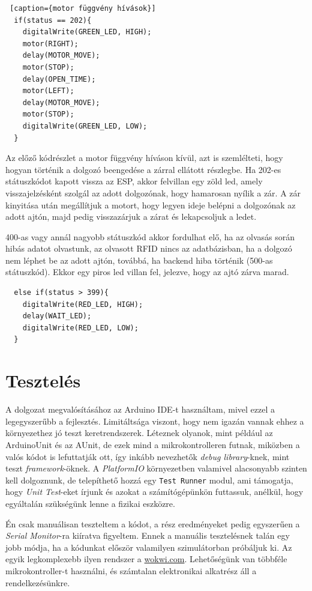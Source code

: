\documentclass[
]{thesis-ekf}
\theoremstyle{definition}
\theoremstyle{remark}
\begin{document}
\begin{lstlisting} [caption={motor függvény hívások}]
  if(status == 202){
    digitalWrite(GREEN_LED, HIGH);
    motor(RIGHT);
    delay(MOTOR_MOVE);
    motor(STOP);
    delay(OPEN_TIME);
    motor(LEFT);
    delay(MOTOR_MOVE);
    motor(STOP);
    digitalWrite(GREEN_LED, LOW);
  }
\end{lstlisting}

Az előző kódrészlet a motor függvény híváson kívül, azt is szemlélteti, hogy hogyan történik a dolgozó beengedése a zárral ellátott részlegbe. Ha 202-es státuszkódot kapott vissza az ESP, akkor felvillan egy zöld led, amely visszajelzésként szolgál az adott dolgozónak, hogy hamarosan nyílik a zár. A zár kinyitása után megállítjuk a motort, hogy legyen ideje belépni a dolgozónak az adott ajtón, majd pedig visszazárjuk a zárat és lekapcsoljuk a ledet.

400-as vagy annál nagyobb státuszkód akkor fordulhat elő, ha az olvasás során hibás adatot olvastunk, az olvasott RFID nincs az adatbázisban, ha a dolgozó nem léphet be az adott ajtón, továbbá, ha backend hiba történik (500-as státuszkód). Ekkor egy piros led villan fel, jelezve, hogy az ajtó zárva marad.

\begin{lstlisting}
  else if(status > 399){
    digitalWrite(RED_LED, HIGH);
    delay(WAIT_LED);
    digitalWrite(RED_LED, LOW);
  }
\end{lstlisting}

\section{Tesztelés} \label{eloszott-teszteles}
A dolgozat megvalósításához az Arduino IDE-t használtam, mivel ezzel a legegyszerűbb a fejlesztés. Limitáltsága viszont, hogy nem igazán vannak ehhez a környezethez jó teszt keretrendszerek. Léteznek olyanok, mint például az ArduinoUnit és az AUnit, de ezek mind a mikrokontrolleren futnak, miközben a valós kódot is lefuttatják ott, így inkább nevezhetők \emph{debug library}-knek, mint teszt \emph{framework}-öknek. \cite{arduino-unit} A \emph{PlatformIO} környezetben valamivel alacsonyabb szinten kell dolgoznunk, de telepíthető hozzá egy \texttt{Test Runner} modul, ami támogatja, hogy \emph{Unit Test}-eket írjunk és azokat a számítógépünkön futtassuk, anélkül, hogy egyáltalán szükségünk lenne a fizikai eszközre. \cite{platformio-unit}

Én csak manuálisan teszteltem a kódot, a rész eredményeket pedig egyszerűen a \emph{Serial Monitor}-ra kiíratva figyeltem. Ennek a manuális tesztelésnek talán egy jobb módja, ha a kódunkat először valamilyen szimulátorban próbáljuk ki. Az egyik legkomplexebb ilyen rendszer a \url{wokwi.com}. Lehetőségünk van többféle mikrokontroller-t használni, és számtalan elektronikai alkatrész áll a rendelkezésünkre.
\end{document}
